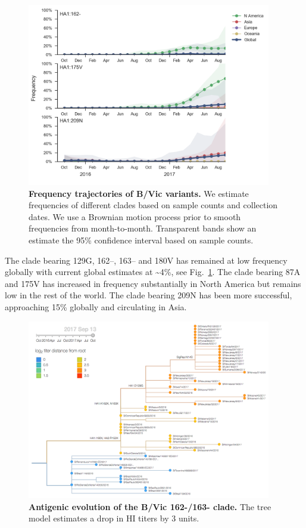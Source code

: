 \documentclass[11pt,oneside,letterpaper]{article}
\newcommand{\FIG}[1]{Fig.~\ref{#1}}
\begin{document}
\clearpage
\begin{figure}[H]
  \centering
  \includegraphics[width=0.95\textwidth]{../figures/sep-2017/vic_mutations.png}
  \caption{\textbf{Frequency trajectories of B/Vic variants.}
  We estimate frequencies of different clades based on sample counts and collection dates.
  We use a Brownian motion process prior to smooth frequencies from month-to-month.
  Transparent bands show an estimate the 95\% confidence interval based on sample counts.
  }
  \label{Vic_mutations}
\end{figure}
The clade bearing 129G, 162--, 163-- and 180V has remained at low
frequency globally with current global estimates at
\textasciitilde{}4\%, see \FIG{Vic_mutations}. The clade bearing 87A and 175V has increased in
frequency substantially in North America but remains low in the rest of
the world. The clade bearing 209N has been more successful, approaching
15\% globally and circulating in Asia.

\clearpage
\begin{figure}[H]
  \centering
  \includegraphics[width=0.95\textwidth]{../figures/sep-2017/vic_tree_titer_model.png}
  \caption{\textbf{Antigenic evolution of the B/Vic 162-/163- clade.}
  The tree model estimates a drop in HI titers by 3 units.
  }
  \label{Vic_titers}
\end{figure}
\end{document}
